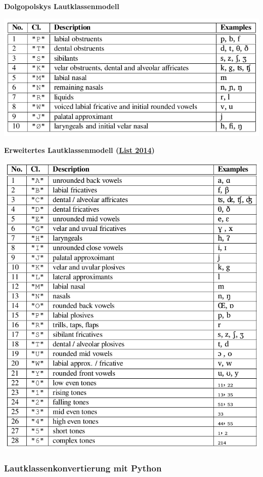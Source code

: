 \par\noindent\textbf{Dolgopolskys Lautklassenmodell}

\href{img/dolgo.png}{\includegraphics{img/dolgo.png}}



\par\noindent\textbf{Erweitertes Lautklassenmodell
(\href{http://bibliography.lingpy.org?key=List2014d}{List 2014})}

\href{img/sca.png}{\includegraphics{img/sca.png}}


\subsubsection{\texorpdfstring{{Lautklassenkonvertierung mit
Python}}{Lautklassenkonvertierung mit Python}}

